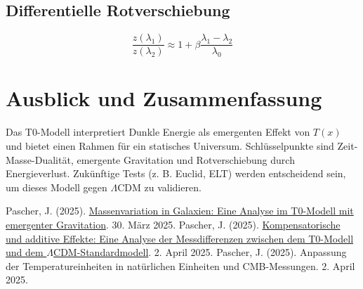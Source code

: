 \documentclass[a4paper,12pt]{article}
\theoremstyle{definition}
\theoremstyle{remark}
\newcommand{\Tfield}{T(x)} %
\begin{document}
	\subsection{Differentielle Rotverschiebung}
	
	\begin{equation}
		\frac{z(\lambda_1)}{z(\lambda_2)} \approx 1 + \beta\frac{\lambda_1 - \lambda_2}{\lambda_0}
	\end{equation}
	
	\section{Ausblick und Zusammenfassung}
	
	Das T0-Modell interpretiert Dunkle Energie als emergenten Effekt von \(\Tfield\) und bietet einen Rahmen für ein statisches Universum. Schlüsselpunkte sind Zeit-Masse-Dualität, emergente Gravitation und Rotverschiebung durch Energieverlust. Zukünftige Tests (z. B. Euclid, ELT) werden entscheidend sein, um dieses Modell gegen \(\Lambda\)CDM zu validieren.
	
	\begin{thebibliography}{3}
		 Pascher, J. (2025). \href{https://github.com/jpascher/T0-Time-Mass-Duality/tree/main/2/pdf/Deutsch/Massenvariation in Galaxien - Eine Analyse im T0-Modell mit emergenter Gravitation.pdf}{Massenvariation in Galaxien: Eine Analyse im T0-Modell mit emergenter Gravitation}. 30. März 2025.
		 Pascher, J. (2025). \href{https://github.com/jpascher/T0-Time-Mass-Duality/tree/main/2/pdf/Deutsch/Analyse der Messdifferenzen zwischen dem T0-Modell und dem Standardmodell.pdf}{Kompensatorische und additive Effekte: Eine Analyse der Messdifferenzen zwischen dem T0-Modell und dem \(\Lambda\)CDM-Standardmodell}. 2. April 2025.
		 Pascher, J. (2025). Anpassung der Temperatureinheiten in natürlichen Einheiten und CMB-Messungen. 2. April 2025.
	\end{thebibliography}
	
\end{document}
